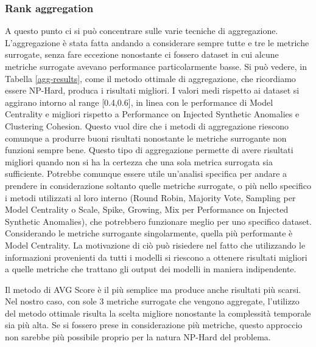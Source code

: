 \newpage
\subsubsection{Rank aggregation}
A questo punto ci si può concentrare sulle varie tecniche di aggregazione. L'aggregazione è stata fatta andando a considerare sempre tutte e tre le metriche surrogate, senza fare eccezione nonostante ci fossero dataset in cui alcune metriche surrogate avevano performance particolarmente basse. 
Si può vedere, in Tabella \ref{agg-results}, come il metodo ottimale di aggregazione, che ricordiamo essere NP-Hard, produca i risultati migliori. 
I valori medi rispetto ai dataset si aggirano intorno al range [0.4,0.6], in linea con le performance di Model Centrality e migliori rispetto a Performance on Injected Synthetic Anomalies e Clustering Cohesion. Questo vuol dire che i metodi di aggregazione riescono comunque a produrre buoni risultati nonostante le metriche surrogante non funzioni sempre bene. 
Questo tipo di aggregazione permette di avere risultati migliori quando non si ha la certezza che una sola metrica surrogata sia sufficiente. Potrebbe comunque essere utile un'analisi specifica per andare a prendere in considerazione soltanto quelle metriche surrogate, o più nello specifico i metodi utilizzati al loro interno (Round Robin, Majority Vote, Sampling per Model Centrality o Scale, Spike, Growing, Mix per Performance on Injected Synthetic Anomalies), che potrebbero funzionare meglio per uno specifico dataset. 
Considerando le metriche surrogante singolarmente, quella più performante è Model Centrality. La motivazione di ciò può risiedere nel fatto che utilizzando le informazioni provenienti da tutti i modelli si riescono a ottenere risultati migliori a quelle metriche che trattano gli output dei modelli in maniera indipendente.

Il metodo di AVG Score è il più semplice ma produce anche risultati più scarsi. Nel nostro caso, con sole 3 metriche surrogate che vengono aggregate, l'utilizzo del metodo ottimale risulta la scelta migliore nonostante la complessità temporale sia più alta. Se si fossero prese in considerazione più metriche, questo approccio non sarebbe più possibile proprio per la natura NP-Hard del problema.

